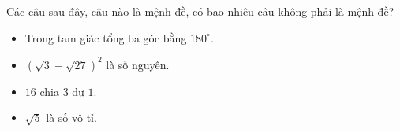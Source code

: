 \begin{ex}%
	Các câu sau đây, câu nào là mệnh đề, có bao nhiêu câu không phải là mệnh đề?
	\begin{itemize}
		\item Trong tam giác tổng ba góc bằng $180^{\circ}$.
		\item $(\sqrt{3}-\sqrt{27})^2$ là số nguyên.
		\item $16$ chia  $3$  dư $1$.
		\item $\sqrt{5}$ là số vô tỉ.
	\end{itemize}
\end{ex}

